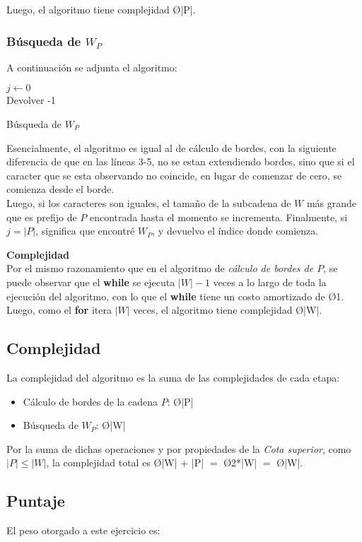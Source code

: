 Luego, el algoritmo tiene complejidad \O{|P|}.\\
\strut\hfill\qedsymbol

\subsubsection{Búsqueda de $W_P$}
A continuación se adjunta el algoritmo:\\
\begin{algorithm}[H]
 \DontPrintSemicolon
 $j \gets 0$\\
 Devolver -1
 \caption{Búsqueda de $W_P$}
\end{algorithm}

Esencialmente, el algoritmo es igual al de cálculo de bordes, con la siguiente diferencia de que en las líneas 3-5, no se estan extendiendo bordes, sino que si el caracter que se esta observando no coincide, en lugar de comenzar de cero, se comienza desde el borde.\\
Luego, si los caracteres son iguales, el tamaño de la subcadena de $W$ más grande que es prefijo de $P$ encontrada hasta el momento se incrementa.
Finalmente, si $j = |P|$, significa que encontré $W_P$, y devuelvo el índice donde comienza.

\textbf{Complejidad}\\
Por el mismo razonamiento que en el algoritmo de \emph{cálculo de bordes de $P$}, se puede observar que el \textbf{while} se ejecuta $|W|-1$ veces a lo largo de toda la ejecución del algoritmo, con lo que el \textbf{while} tiene un costo amortizado de \O{1}. Luego, como el \textbf{for} itera $|W|$ veces, el algoritmo tiene complejidad \O{|W|}.

\subsection{Complejidad}
La complejidad del algoritmo es la suma de las complejidades de cada etapa:
\begin{itemize}
	\item Cálculo de bordes de la cadena $P$: \O{|P|}
	\item Búsqueda de $W_P$: \O{|W|}
\end{itemize}

Por la suma de dichas operaciones y por propiedades de la \emph{Cota superior}, como $|P| \leq |W|$, la complejidad total es \O{|W| + |P|} $ = $ \O{2*|W|} $=$ \O{|W|}.

\subsection{Puntaje}
El peso otorgado a este ejercicio es:
